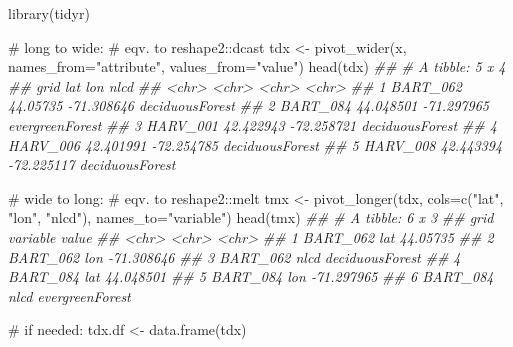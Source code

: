 \documentclass[
  13,
  letterpaper,
]{report}
\newenvironment{Shaded}{\begin{snugshade}}{\end{snugshade}}
\newcommand{\AttributeTok}[1]{\textcolor[rgb]{0.40,0.45,0.13}{#1}}
\newcommand{\CommentTok}[1]{\textcolor[rgb]{0.37,0.37,0.37}{#1}}
\newcommand{\DocumentationTok}[1]{\textcolor[rgb]{0.37,0.37,0.37}{\textit{#1}}}
\newcommand{\FunctionTok}[1]{\textcolor[rgb]{0.28,0.35,0.67}{#1}}
\newcommand{\NormalTok}[1]{\textcolor[rgb]{0.00,0.23,0.31}{#1}}
\newcommand{\OtherTok}[1]{\textcolor[rgb]{0.00,0.23,0.31}{#1}}
\newcommand{\StringTok}[1]{\textcolor[rgb]{0.13,0.47,0.30}{#1}}
\begin{document}
\begin{Shaded}
\begin{Highlighting}[]

\FunctionTok{library}\NormalTok{(tidyr)}

\CommentTok{\# long to wide:}
\CommentTok{\# eqv. to reshape2::dcast}
\NormalTok{tdx }\OtherTok{\textless{}{-}} \FunctionTok{pivot\_wider}\NormalTok{(x, }
                   \AttributeTok{names\_from=}\StringTok{"attribute"}\NormalTok{,}
                   \AttributeTok{values\_from=}\StringTok{"value"}\NormalTok{)}
\FunctionTok{head}\NormalTok{(tdx)}
\DocumentationTok{\#\# \# A tibble: 5 x 4}
\DocumentationTok{\#\#   grid     lat       lon        nlcd           }
\DocumentationTok{\#\#   \textless{}chr\textgreater{}    \textless{}chr\textgreater{}     \textless{}chr\textgreater{}      \textless{}chr\textgreater{}          }
\DocumentationTok{\#\# 1 BART\_062 44.05735  {-}71.308646 deciduousForest}
\DocumentationTok{\#\# 2 BART\_084 44.048501 {-}71.297965 evergreenForest}
\DocumentationTok{\#\# 3 HARV\_001 42.422943 {-}72.258721 deciduousForest}
\DocumentationTok{\#\# 4 HARV\_006 42.401991 {-}72.254785 deciduousForest}
\DocumentationTok{\#\# 5 HARV\_008 42.443394 {-}72.225117 deciduousForest}

\CommentTok{\# wide to long:}
\CommentTok{\# eqv. to reshape2::melt}
\NormalTok{tmx }\OtherTok{\textless{}{-}} \FunctionTok{pivot\_longer}\NormalTok{(tdx,}
               \AttributeTok{cols=}\FunctionTok{c}\NormalTok{(}\StringTok{"lat"}\NormalTok{, }\StringTok{"lon"}\NormalTok{, }\StringTok{"nlcd"}\NormalTok{),}
               \AttributeTok{names\_to=}\StringTok{"variable"}\NormalTok{)}
\FunctionTok{head}\NormalTok{(tmx)}
\DocumentationTok{\#\# \# A tibble: 6 x 3}
\DocumentationTok{\#\#   grid     variable value          }
\DocumentationTok{\#\#   \textless{}chr\textgreater{}    \textless{}chr\textgreater{}    \textless{}chr\textgreater{}          }
\DocumentationTok{\#\# 1 BART\_062 lat      44.05735       }
\DocumentationTok{\#\# 2 BART\_062 lon      {-}71.308646     }
\DocumentationTok{\#\# 3 BART\_062 nlcd     deciduousForest}
\DocumentationTok{\#\# 4 BART\_084 lat      44.048501      }
\DocumentationTok{\#\# 5 BART\_084 lon      {-}71.297965     }
\DocumentationTok{\#\# 6 BART\_084 nlcd     evergreenForest}

\CommentTok{\# if needed:}
\NormalTok{tdx.df }\OtherTok{\textless{}{-}} \FunctionTok{data.frame}\NormalTok{(tdx)}
\end{Highlighting}
\end{Shaded}
\end{document}
